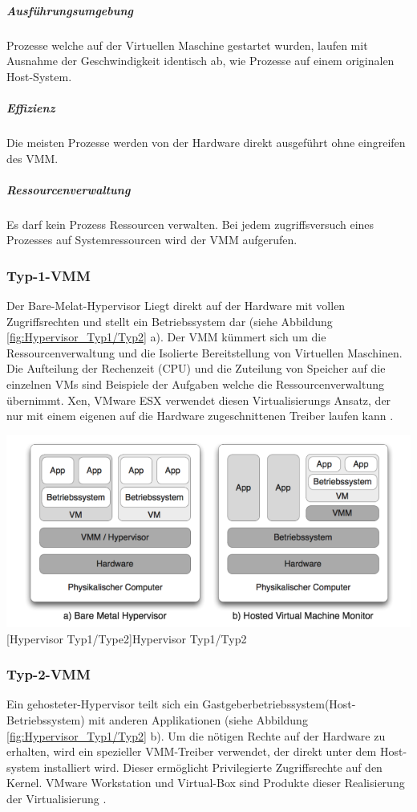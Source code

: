  \subparagraph{Ausführungsumgebung} 
 Prozesse welche auf der Virtuellen Maschine gestartet wurden, laufen mit Ausnahme der  Geschwindigkeit identisch ab, wie Prozesse auf einem originalen Host-System.
 
\subparagraph{Effizienz} 
Die meisten Prozesse werden von der Hardware direkt ausgeführt ohne eingreifen des VMM.

\subparagraph{Ressourcenverwaltung} 
Es darf kein Prozess Ressourcen verwalten. Bei jedem zugriffsversuch eines Prozesses auf Systemressourcen wird der VMM aufgerufen.



\subsubsection{Typ-1-VMM}
Der Bare-Melat-Hypervisor Liegt direkt auf der Hardware mit vollen Zugriffsrechten und stellt ein Betriebssystem dar (siehe Abbildung \ref{fig:Hypervisor_Typ1/Typ2} a). Der VMM kümmert sich um die Ressourcenverwaltung und die Isolierte Bereitstellung von Virtuellen Maschinen. Die Aufteilung der Rechenzeit (CPU) und die Zuteilung von Speicher auf die einzelnen VMs sind Beispiele der Aufgaben welche die Ressourcenverwaltung übernimmt. Xen, VMware ESX \cite{Go-to2018ESXi} verwendet diesen Virtualisierungs Ansatz, der nur mit einem eigenen auf die Hardware zugeschnittenen Treiber laufen kann \cite{Glatz2015Betriebssysteme}.

\vspace{1em}
\begin{minipage}{\linewidth}
	\centering
	\includegraphics[width=1\linewidth]{pics/Hypervisoren.PNG}
	[Hypervisor Typ1/Type2]{Hypervisor Typ1/Typ2 \cite{Meinel2011VirtualisierungMarktubersicht} }
	\label{fig:Hypervisor_Typ1/Typ2}
\end{minipage}

\subsubsection{Typ-2-VMM}
Ein gehosteter-Hypervisor teilt sich ein Gastgeberbetriebssystem(Host-Betriebssystem) mit anderen Applikationen (siehe Abbildung \ref{fig:Hypervisor_Typ1/Typ2} b). Um die nötigen Rechte auf der Hardware zu erhalten, wird ein spezieller VMM-Treiber verwendet, der direkt unter dem Host-system installiert wird. Dieser ermöglicht Privilegierte Zugriffsrechte auf den Kernel. VMware Workstation und Virtual-Box sind Produkte dieser Realisierung der Virtualisierung \cite{Glatz2015Betriebssysteme}.


